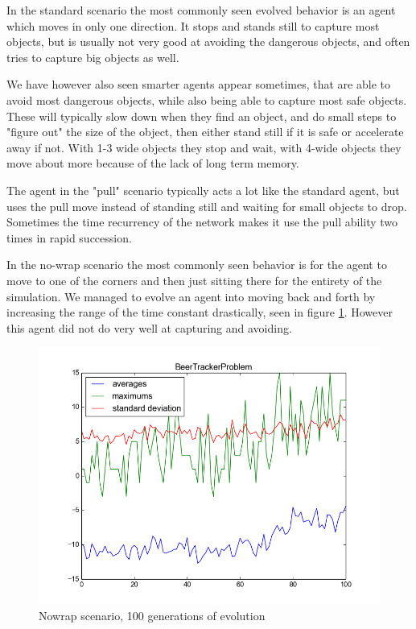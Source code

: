 \documentclass[twoside]{article}
\begin{document}
\begin{multicols}{2}
    In the standard scenario the most commonly seen evolved behavior is an agent which moves in only one direction.
    It stops and stands still to capture most objects,
    but is usually not very good at avoiding the dangerous objects,
    and often tries to capture big objects as well.

    We have however also seen smarter agents appear sometimes,
    that are able to avoid most dangerous objects,
    while also being able to capture most safe objects.
    These will typically slow down when they find an object,
    and do small steps to "figure out" the size of the object,
    then either stand still if it is safe or accelerate away if not.
    With 1-3 wide objects they stop and wait, with 4-wide objects they move about more because of the lack of long term memory.

    The agent in the "pull" scenario typically acts a lot like the standard agent,
    but uses the pull move instead of standing still and waiting for small objects to drop.
    Sometimes the time recurrency of the network makes it use the pull ability two times in rapid succession.

    In the no-wrap scenario the most commonly seen behavior is for the agent to move to one of the corners and then just sitting there for the entirety of the simulation.
    We managed to evolve an agent into moving back and forth by increasing the range of the time constant drastically, seen in figure \ref{nowrap}.
    However this agent did not do very well at capturing and avoiding.

    \begin{figure}[H]
        \centering
        \includegraphics[width=\linewidth]{images/nowrap_highT}
        \caption{Nowrap scenario, 100 generations of evolution}
        \label{nowrap}
    \end{figure}


\end{multicols}
\end{document}
